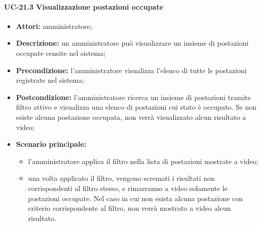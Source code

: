 \paragraph{UC-21.3 Visualizzazione postazioni occupate}
\begin{itemize}
    \item \textbf{Attori:} amministratore;
    \item \textbf{Descrizione:} un amministratore pu\`{o} visualizzare un insieme di postazioni occupate censite nel sistema;
    \item \textbf{Precondizione:} l'amministratore visualizza l'elenco di tutte le postazioni registrate nel sistema;
    \item \textbf{Postcondizione:} l'amministratore ricerca un insieme di postazioni tramite filtro attivo e visualizza una elenco di postazioni cui stato è occupato. Se non esiste alcuna postazione occupata, non verrà visualizzato alcun risultato a video;
    \item \textbf{Scenario principale:}
    \begin{itemize}
        \item l'amministratore applica il filtro nella lista di postazioni mostrate a video;
        \item una volta applicato il filtro, vengono scremati i risultati non corrispondenti al filtro stesso, e rimarranno a video solamente le postazioni occupate. Nel caso in cui non esista alcuna postazione con criterio corrispondente al filtro, non verrà mostrato a video alcun risultato.
    \end{itemize}
\end{itemize}

